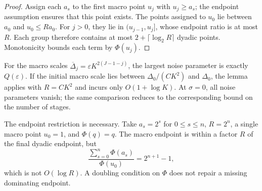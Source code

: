 \documentclass[11pt,a4paper]{article}
\newcommand{\eps}{\varepsilon}
\theoremstyle{definition}
\theoremstyle{remark}
\begin{document}
\begin{proof}
Assign each $a_s$ to the first macro point $u_j$ with
$u_j\ge a_s$; the endpoint assumption ensures that this
point exists.  The points assigned to $u_0$ lie between
$a_0$ and $u_0\le R a_0$.  For $j>0$, they lie in
$(u_{j-1},u_j]$, whose endpoint ratio is at most $R$.
Each group therefore contains at most
$2+\lceil\log_2R\rceil$ dyadic points.
Monotonicity bounds each term by $\Phi(u_j)$.
\end{proof}

For the macro scales
$\overline\Delta_j=\eps K^{2(J-1-j)}$, the largest noise
parameter is exactly $Q(\eps)$.  If the initial macro scale
lies between $\Delta_0/(C K^2)$ and $\Delta_0$, the lemma
applies with $R=C K^2$ and incurs only $O(1+\log K)$.
At $\sigma=0$, all noise parameters vanish; the same
comparison reduces to the corresponding bound on the
number of stages.

The endpoint restriction is necessary.  Take
$a_s=2^s$ for $0\le s\le n$, $R=2^n$, a single macro
point $u_0=1$, and $\Phi(q)=q$.
The macro endpoint is within a factor $R$ of the final
dyadic endpoint, but
\[
 \frac{\sum_{s=0}^n\Phi(a_s)}{\Phi(u_0)}
 =2^{n+1}-1,
\]
which is not $O(\log R)$.  A doubling condition on $\Phi$
does not repair a missing dominating endpoint.
\end{document}
